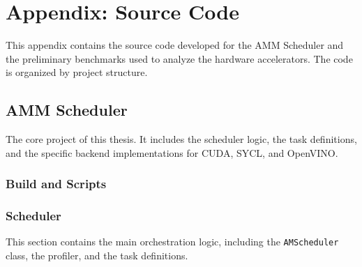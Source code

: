 \chapter{Appendix: Source Code}
\label{appendix:source_code}

This appendix contains the source code developed for the AMM Scheduler and the preliminary benchmarks used to analyze the hardware accelerators. The code is organized by project structure.

\section{AMM Scheduler}
\label{appamm}
The core project of this thesis. It includes the scheduler logic, the task definitions, and the specific backend implementations for CUDA, SYCL, and OpenVINO.

\subsection{Build and Scripts}
\label{appbuild}





\subsection{Scheduler}
\label{appscheduler}
This section contains the main orchestration logic, including the \texttt{AMScheduler} class, the profiler, and the task definitions.











